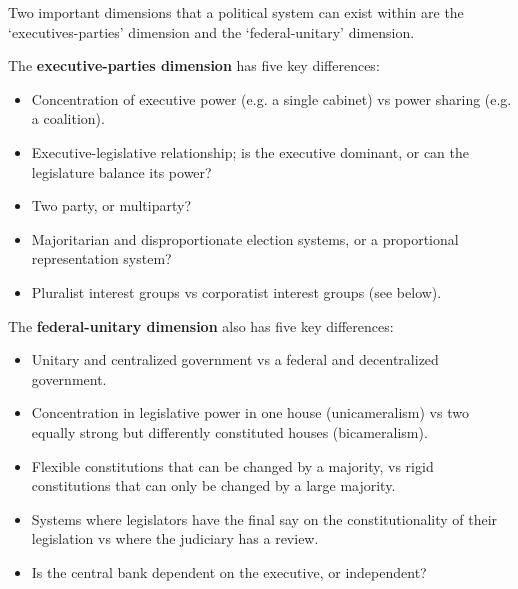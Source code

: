
Two important dimensions that a political system can exist within are
the `executives-parties' dimension and the `federal-unitary'
dimension.


The \textbf{executive-parties dimension} has five key differences:

\begin{itemize}
  \item Concentration of executive power (e.g. a single cabinet) vs
    power sharing (e.g. a coalition).
  \item Executive-legislative relationship; is the executive dominant,
    or can the legislature balance its power?
  \item Two party, or multiparty?
  \item Majoritarian and disproportionate election systems, or
    a proportional representation system?
  \item Pluralist interest groups vs corporatist interest groups (see
    below).
\end{itemize}


The \textbf{federal-unitary dimension} also has five key differences:

\begin{itemize}
  \item Unitary and centralized government vs a federal and
    decentralized government.
  \item Concentration in legislative power in one house
    (unicameralism) vs two equally strong but differently constituted
    houses (bicameralism).
  \item Flexible constitutions that can be changed by a majority, vs
    rigid constitutions that can only be changed by a large majority.
  \item Systems where legislators have the final say on the
    constitutionality of their legislation vs where the judiciary has
    a review.
  \item Is the central bank dependent on the executive, or
    independent?
\end{itemize}

